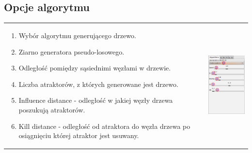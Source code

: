 \subsection{Opcje algorytmu}
\begin{tabular}{lr}
\parbox[c]{95mm}{
\begin{enumerate}
	\item {Wybór algorytmu generującego drzewo.}
	\item {Ziarno generatora pseudo-losowego.}
	\item {Odległość pomiędzy sąsiednimi węzłami w drzewie.}
	\item {Liczba atraktorów, z których generowane jest drzewo.}
	\item {Influence distance - odległość w jakiej węzły drzewa poszukują atraktorów.}
	\item {Kill distance - odległość od atraktora do węzła drzewa po osiągnięciu której atraktor jest usuwany.}
\end{enumerate}
} &
\parbox[c]{35mm}{
\includegraphics[width=35mm]{images/gui/algorithms_panel.png}
}\\
\end{tabular}



